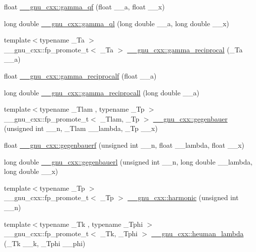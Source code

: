 \begin{DoxyCompactItemize}
float \hyperlink{group__gnu__math__spec__func_ga3ee8d2c40b904952538709cbb0e664a4}{\+\_\+\+\_\+gnu\+\_\+cxx\+::gamma\+\_\+qf} (float \+\_\+\+\_\+a, float \+\_\+\+\_\+x)
\item 
long double \hyperlink{group__gnu__math__spec__func_ga5364a098596681809294d25741539ffc}{\+\_\+\+\_\+gnu\+\_\+cxx\+::gamma\+\_\+ql} (long double \+\_\+\+\_\+a, long double \+\_\+\+\_\+x)
\item 
{\footnotesize template$<$typename \+\_\+\+Ta $>$ }\\\+\_\+\+\_\+gnu\+\_\+cxx\+::fp\+\_\+promote\+\_\+t$<$ \+\_\+\+Ta $>$ \hyperlink{group__gnu__math__spec__func_ga641f9bcdb8fc32a9a0ce7a15b5040076}{\+\_\+\+\_\+gnu\+\_\+cxx\+::gamma\+\_\+reciprocal} (\+\_\+\+Ta \+\_\+\+\_\+a)
\item 
float \hyperlink{group__gnu__math__spec__func_ga10cccd5045490ac24590c094c43107d8}{\+\_\+\+\_\+gnu\+\_\+cxx\+::gamma\+\_\+reciprocalf} (float \+\_\+\+\_\+a)
\item 
long double \hyperlink{group__gnu__math__spec__func_ga73bfcace13daa8b50e7e7e3f583a2eb0}{\+\_\+\+\_\+gnu\+\_\+cxx\+::gamma\+\_\+reciprocall} (long double \+\_\+\+\_\+a)
\item 
{\footnotesize template$<$typename \+\_\+\+Tlam , typename \+\_\+\+Tp $>$ }\\\+\_\+\+\_\+gnu\+\_\+cxx\+::fp\+\_\+promote\+\_\+t$<$ \+\_\+\+Tlam, \+\_\+\+Tp $>$ \hyperlink{group__gnu__math__spec__func_ga512e7981e328d6184f604de1892048b6}{\+\_\+\+\_\+gnu\+\_\+cxx\+::gegenbauer} (unsigned int \+\_\+\+\_\+n, \+\_\+\+Tlam \+\_\+\+\_\+lambda, \+\_\+\+Tp \+\_\+\+\_\+x)
\item 
float \hyperlink{group__gnu__math__spec__func_ga3eda0a3546848c5b3a2d4d9b5910d6b1}{\+\_\+\+\_\+gnu\+\_\+cxx\+::gegenbauerf} (unsigned int \+\_\+\+\_\+n, float \+\_\+\+\_\+lambda, float \+\_\+\+\_\+x)
\item 
long double \hyperlink{group__gnu__math__spec__func_ga1f1110d7a116bd5636924bb96d24ecc3}{\+\_\+\+\_\+gnu\+\_\+cxx\+::gegenbauerl} (unsigned int \+\_\+\+\_\+n, long double \+\_\+\+\_\+lambda, long double \+\_\+\+\_\+x)
\item 
{\footnotesize template$<$typename \+\_\+\+Tp $>$ }\\\+\_\+\+\_\+gnu\+\_\+cxx\+::fp\+\_\+promote\+\_\+t$<$ \+\_\+\+Tp $>$ \hyperlink{group__gnu__math__spec__func_gab052b72af9c7ec030bcea81965390614}{\+\_\+\+\_\+gnu\+\_\+cxx\+::harmonic} (unsigned int \+\_\+\+\_\+n)
\item 
{\footnotesize template$<$typename \+\_\+\+Tk , typename \+\_\+\+Tphi $>$ }\\\+\_\+\+\_\+gnu\+\_\+cxx\+::fp\+\_\+promote\+\_\+t$<$ \+\_\+\+Tk, \+\_\+\+Tphi $>$ \hyperlink{group__gnu__math__spec__func_ga7537f96eedc8571ed1987481b2863e89}{\+\_\+\+\_\+gnu\+\_\+cxx\+::heuman\+\_\+lambda} (\+\_\+\+Tk \+\_\+\+\_\+k, \+\_\+\+Tphi \+\_\+\+\_\+phi)

\end{DoxyCompactItemize}
